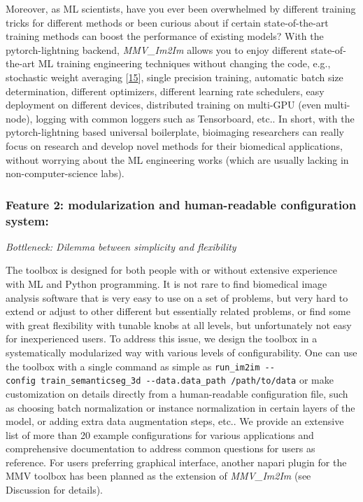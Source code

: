 Moreover, as ML scientists, have you ever been overwhelmed by different training tricks for different methods or been curious about if certain state-of-the-art training methods can boost the performance of existing models? With the pytorch-lightning backend, \emph{MMV\_Im2Im} allows you to enjoy different state-of-the-art ML training engineering techniques without changing the code, e.g., stochastic weight averaging {[}\protect\hyperlink{ref-qzeQFRn9}{15}{]}, single precision training, automatic batch size determination, different optimizers, different learning rate schedulers, easy deployment on different devices, distributed training on multi-GPU (even multi-node), logging with common loggers such as Tensorboard, etc.. In short, with the pytorch-lightning based universal boilerplate, bioimaging researchers can really focus on research and develop novel methods for their biomedical applications, without worrying about the ML engineering works (which are usually lacking in non-computer-science labs).

\hypertarget{feature-2-modularization-and-human-readable-configuration-system}{%
\subsubsection{Feature 2: modularization and human-readable configuration system:}\label{feature-2-modularization-and-human-readable-configuration-system}}

\emph{Bottleneck: Dilemma between simplicity and flexibility}

The toolbox is designed for both people with or without extensive experience with ML and Python programming. It is not rare to find biomedical image analysis software that is very easy to use on a set of problems, but very hard to extend or adjust to other different but essentially related problems, or find some with great flexibility with tunable knobs at all levels, but unfortunately not easy for inexperienced users. To address this issue, we design the toolbox in a systematically modularized way with various levels of configurability. One can use the toolbox with a single command as simple as \texttt{run\_im2im\ -\/-config\ train\_semanticseg\_3d\ -\/-data.data\_path\ /path/to/data} or make customization on details directly from a human-readable configuration file, such as choosing batch normalization or instance normalization in certain layers of the model, or adding extra data augmentation steps, etc.. We provide an extensive list of more than 20 example configurations for various applications and comprehensive documentation to address common questions for users as reference. For users preferring graphical interface, another napari plugin for the MMV toolbox has been planned as the extension of \emph{MMV\_Im2Im} (see Discussion for details).

